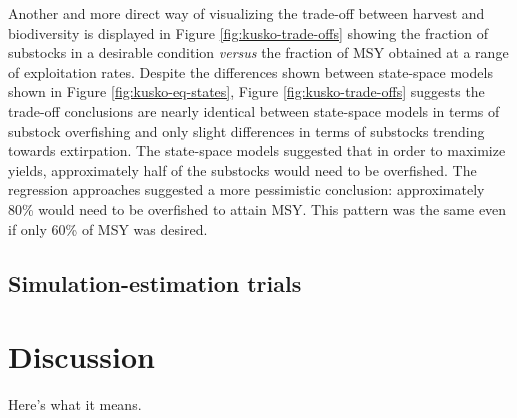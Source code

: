 \documentclass[12pt,]{book}
\theoremstyle{definition}
\theoremstyle{definition}
\theoremstyle{definition}
\theoremstyle{remark}
\begin{document}
Another and more direct way of visualizing the trade-off between harvest
and biodiversity is displayed in Figure \ref{fig:kusko-trade-offs}
showing the fraction of substocks in a desirable condition \emph{versus}
the fraction of MSY obtained at a range of exploitation rates. Despite
the differences shown between state-space models shown in Figure
\ref{fig:kusko-eq-states}, Figure \ref{fig:kusko-trade-offs} suggests
the trade-off conclusions are nearly identical between state-space
models in terms of substock overfishing and only slight differences in
terms of substocks trending towards extirpation. The state-space models
suggested that in order to maximize yields, approximately half of the
substocks would need to be overfished. The regression approaches
suggested a more pessimistic conclusion: approximately 80\% would need
to be overfished to attain MSY. This pattern was the same even if only
60\% of MSY was desired.

\subsection{Simulation-estimation
trials}\label{simulation-estimation-trials}

\section{Discussion}\label{discussion}

Here's what it means.

\singlespacing

\clearpage
\end{document}
